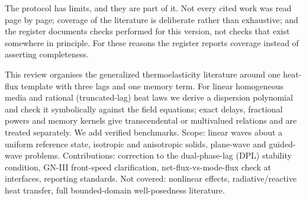 The protocol has limits, and they are part of it. Not every cited work was read page by page; coverage of
the literature is deliberate rather than exhaustive; and the register documents checks performed for this
version, not checks that exist somewhere in principle. For these reasons the register reports coverage
instead of asserting completeness.

\begin{summarybox}[Summary]
This review organises the generalized thermoelasticity literature around one heat-flux template with three lags and one memory term. For linear homogeneous media and rational (truncated-lag) heat laws we derive a dispersion polynomial and check it symbolically against the field equations; exact delays, fractional powers and memory kernels give transcendental or multivalued relations and are treated separately. We add verified benchmarks. Scope: linear waves about a uniform reference state, isotropic and anisotropic solids, plane-wave and guided-wave problems. Contributions: correction to the dual-phase-lag (DPL) stability condition, GN-III front-speed clarification, net-flux-vs-mode-flux check at interfaces, reporting standards. Not covered: nonlinear effects, radiative/reactive heat transfer, full bounded-domain well-posedness literature.
\end{summarybox}
